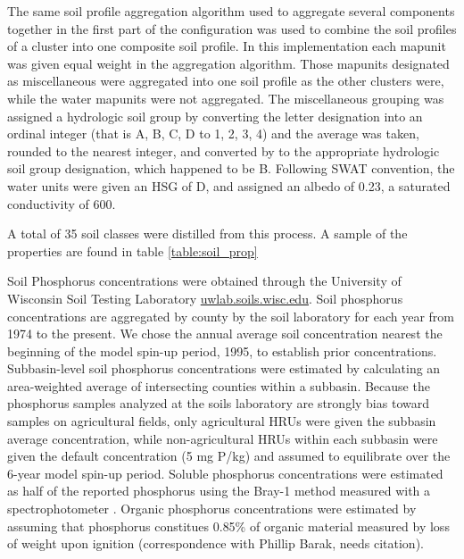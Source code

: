 The same soil profile aggregation algorithm \citep{beaudette_aqp_2013} used to aggregate several components together in the first part of the configuration was used to combine the soil profiles of a cluster into one composite soil profile. In this implementation each mapunit was given equal weight in the aggregation algorithm. Those mapunits designated as miscellaneous were aggregated into one soil profile as the other clusters were, while the water mapunits were not aggregated. The miscellaneous  grouping was assigned a hydrologic soil group by converting the letter designation into an ordinal integer (that is A, B, C, D to 1, 2, 3, 4) and the average was taken, rounded to the nearest integer, and converted by to the appropriate hydrologic soil group designation, which happened to be B. Following SWAT convention, the water units were given an HSG of D, and assigned an albedo of 0.23, a saturated conductivity of 600.

A total of 35 soil classes were distilled from this process. A sample of the properties are found in table \ref{table:soil_prop}


Soil Phosphorus concentrations were obtained through the University of Wisconsin Soil Testing Laboratory \href{http://uwlab.soils.wisc.edu/}{uwlab.soils.wisc.edu}. Soil phosphorus concentrations are aggregated by county by the soil laboratory for each year from 1974 to the present. We chose the annual average soil concentration nearest the beginning of the model spin-up period, 1995, to establish prior concentrations. Subbasin-level soil phosphorus concentrations were estimated by calculating an area-weighted average of intersecting counties within a subbasin. Because the phosphorus samples analyzed at the soils laboratory are strongly bias toward samples on agricultural fields, only agricultural HRUs were given the subbasin average concentration, while non-agricultural HRUs within each subbasin were given the default concentration (5 mg P/kg) and assumed to equilibrate over the 6-year model spin-up period. Soluble phosphorus concentrations were estimated as half of the reported phosphorus using the Bray-1 method measured with a spectrophotometer \citep{vadas_validating_2010}. Organic phosphorus concentrations were estimated by assuming that phosphorus constitues 0.85\% of organic material measured by loss of weight upon ignition (correspondence with Phillip Barak, needs citation).